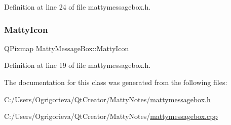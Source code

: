 Definition at line 24 of file mattymessagebox.\+h.

\hypertarget{classMattyMessageBox_acd535bd7bec5cf024ea72146a0cbc4b6}{}\label{classMattyMessageBox_acd535bd7bec5cf024ea72146a0cbc4b6} 
\subsubsection{\texorpdfstring{Matty\+Icon}{MattyIcon}}
{\footnotesize\ttfamily Q\+Pixmap Matty\+Message\+Box\+::\+Matty\+Icon\hspace{0.3cm}{\ttfamily [private]}}



Definition at line 19 of file mattymessagebox.\+h.



The documentation for this class was generated from the following files\+:\begin{DoxyCompactItemize}
\item 
C\+:/\+Users/\+Ogrigorieva/\+Qt\+Creator/\+Matty\+Notes/\hyperlink{mattymessagebox_8h}{mattymessagebox.\+h}\item 
C\+:/\+Users/\+Ogrigorieva/\+Qt\+Creator/\+Matty\+Notes/\hyperlink{mattymessagebox_8cpp}{mattymessagebox.\+cpp}\end{DoxyCompactItemize}

